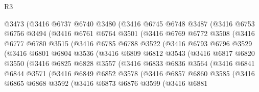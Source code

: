 \begin{lexlean}{R3}
\begin{coremodule}
          @3473
          (@3416
            @6737
            @6740
            @3480
            (@3416
              @6745
              @6748
              @3487
              (@3416
                @6753
                @6756
                @3494
                (@3416
                  @6761
                  @6764
                  @3501
                  (@3416
                    @6769
                    @6772
                    @3508
                    (@3416
                      @6777
                      @6780
                      @3515
                      (@3416
                        @6785
                        @6788
                        @3522
                        (@3416
                          @6793
                          @6796
                          @3529
                          (@3416
                            @6801
                            @6804
                            @3536
                            (@3416
                              @6809
                              @6812
                              @3543
                              (@3416
                                @6817
                                @6820
                                @3550
                                (@3416
                                  @6825
                                  @6828
                                  @3557
                                  (@3416
                                    @6833
                                    @6836
                                    @3564
                                    (@3416
                                      @6841
                                      @6844
                                      @3571
                                      (@3416
                                        @6849
                                        @6852
                                        @3578
                                        (@3416
                                          @6857
                                          @6860
                                          @3585
                                          (@3416
                                            @6865
                                            @6868
                                            @3592
                                            (@3416
                                              @6873
                                              @6876
                                              @3599
                                              (@3416
                                                @6881

\end{coremodule}
\end{lexlean}
